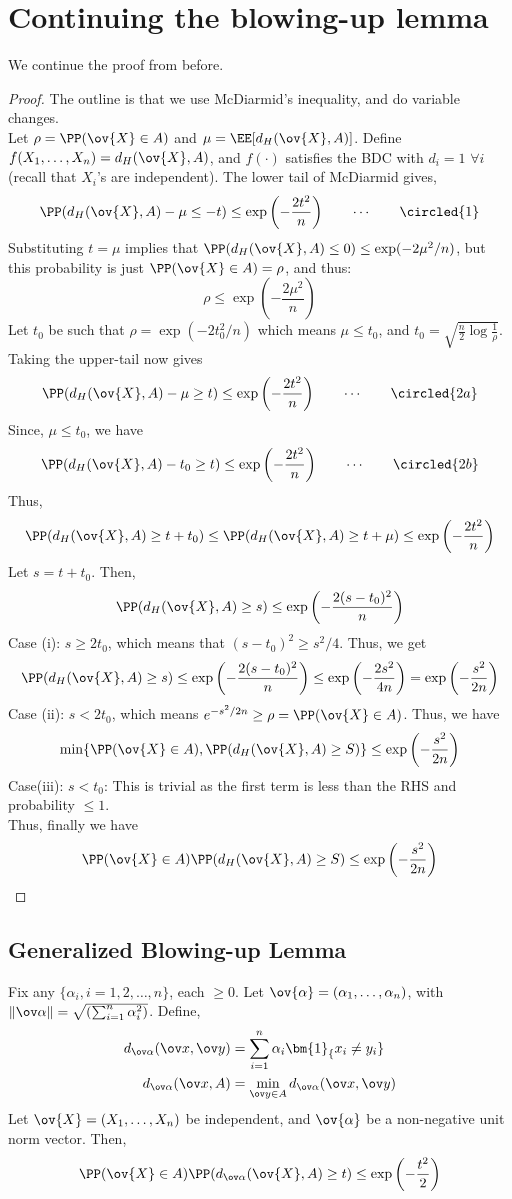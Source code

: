 \chapter{Continuing the blowing-up lemma}
We continue the proof from before.
\begin{proof}
The outline is that we use McDiarmid's inequality, and do variable changes. \\
Let $\rho = \PP(\ov{X} \in A)$ and $\mu = \EE[d_H(\ov{X}, A)]$. Define $f(X_1, \dots, X_n) = d_H(\ov{X}, A)$, and $f(\cdot)$ satisfies the BDC with $d_i = 1$ $\forall i$ (recall that $X_i$'s are independent). The lower tail of McDiarmid gives,
\[
\PP(d_H(\ov{X}, A) - \mu \leq -t) \leq \exp\left(-\frac{2t^2}{n}\right) \qquad \cdots \qquad\circled{1}
\]
Substituting $t = \mu$ implies that $\PP(d_H(\ov{X}, A) \leq 0) \leq \exp(-2\mu^2 / n)$, but this probability is just $\PP(\ov{X} \in A) = \rho$, and thus:
\[
\rho \leq \exp\left(-\frac{2\mu^2}{n}\right)
\]
Let $t_0$ be such that $\rho = \exp(-2t_0^2 / n)$ which means $\mu \leq t_0$, and $t_0 = \sqrt{\frac{n}{2}\log\frac{1}{\rho}}$. \\
Taking the upper-tail now gives
\[
\PP(d_H(\ov{X}, A) - \mu \geq t) \leq \exp\left(-\frac{2t^2}{n}\right) \qquad \cdots \qquad\circled{2a}
\]
Since, $\mu \leq t_0$, we have
\[
\PP(d_H(\ov{X}, A) - t_0 \geq t) \leq \exp\left(-\frac{2t^2}{n}\right) \qquad \cdots \qquad\circled{2b}
\]
Thus,
\[
\PP(d_H(\ov{X}, A) \geq t + t_0) \leq \PP(d_H(\ov{X}, A) \geq t + \mu) \leq \exp\left(-\frac{2t^2}{n}\right) 
\]
Let $s = t + t_0$. Then,
\[
\PP(d_H(\ov{X}, A) \geq s) \leq \exp\left(-\frac{2(s-t_0)^2}{n}\right) 
\]
Case (i): $s \geq 2t_0$, which means that $(s-t_0)^2 \geq s^2/4$. Thus, we get 
\[
\PP(d_H(\ov{X}, A) \geq s) \leq \exp\left(-\frac{2(s-t_0)^2}{n}\right) \leq \exp\left(-\frac{2s^2}{4n}\right) = \exp\left(-\frac{s^2}{2n}\right)
\]
Case (ii): $s < 2t_0$, which means $e^{-s^2/2n} \geq \rho = \PP(\ov{X} \in A)$. Thus, we have
\[
\min\{\PP(\ov{X} \in A), \PP(d_H(\ov{X}, A) \geq S)\} \leq \exp\left(-\frac{s^2}{2n}\right)
\]
Case(iii): $s < t_0$: This is trivial as the first term is less than the RHS and probability $\leq 1$. \\
Thus, finally we have
\[
\PP(\ov{X} \in A)\PP(d_H(\ov{X}, A) \geq S) \leq \exp\left(-\frac{s^2}{2n}\right)
\]
\end{proof}
\section{Generalized Blowing-up Lemma}
\begin{lemma}
Fix any $\{\alpha_i, i = 1, 2, \dots, n\}$, each $\geq 0$. Let $\ov{\alpha} = (\alpha_1, \dots, \alpha_n)$, with $\|\ov\alpha\| = \sqrt{\left(\sum_{i=1}^n \alpha_i^2\right)}$. Define,
\[
\begin{split}
    d_{\ov\alpha}(\ov x, \ov y) &= \sum_{i=1}^n \alpha_i \bm{1}_\{x_i \neq y_i\} \\ 
    d_{\ov\alpha}(\ov x, A) &= \min_{\ov y \in A}d_{\ov\alpha}(\ov x, \ov y)
\end{split}
\]
Let $\ov{X} = (X_1, \dots, X_n)$ be independent, and $\ov{\alpha}$ be a non-negative unit norm vector. Then,
\[
\PP(\ov{X} \in A) \PP(d_{\ov\alpha} (\ov{X}, A) \geq t) \leq \exp\left(-\frac{t^2}{2}\right)
\]
\end{lemma}
